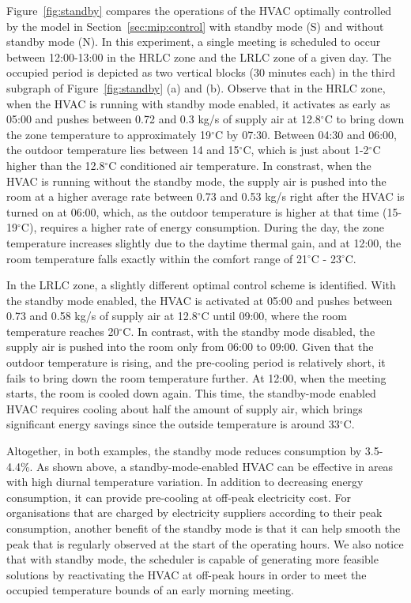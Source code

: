 Figure~\ref{fig:standby} compares the operations of the HVAC optimally controlled by the model in Section~\ref{sec:mip:control} with standby mode (S) and without standby mode (N). In this experiment, a single meeting is scheduled to occur between 12:00-13:00 in the HRLC zone and the LRLC zone of a given day. The occupied period is depicted as two vertical blocks (30 minutes each) in the third subgraph of Figure~\ref{fig:standby} (a) and (b). Observe that in the HRLC zone, when the HVAC is running with standby mode enabled, it activates as early as 05:00 and pushes between 0.72 and 0.3 kg/s of supply air at 12.8$^\circ$C to bring down the zone temperature to approximately 19$^\circ$C by 07:30. Between 04:30 and 06:00, the outdoor temperature lies between 14 and 15$^\circ$C, which is just about 1-2$^\circ$C higher than the 12.8$^\circ$C conditioned air temperature. In constrast, when the HVAC is running without the standby mode, the supply air is pushed into the room at a higher average rate between 0.73 and 0.53 kg/s right after the HVAC is turned on at 06:00, which, as the outdoor temperature is higher at that time (15-19$^\circ$C), requires a higher rate of energy consumption. During the day, the zone temperature increases slightly due to the daytime thermal gain, and at 12:00, the room temperature falls exactly within the comfort range of 21$^\circ$C - 23$^\circ$C. 

In the LRLC zone, a slightly different optimal control scheme is identified. With the standby mode enabled, the HVAC is activated at 05:00 and pushes between 0.73 and 0.58 kg/s of supply air at 12.8$^\circ$C until 09:00, where the room temperature reaches 20$^\circ$C. In contrast, with the standby mode disabled, the supply air is pushed into the room only from 06:00 to 09:00. Given that the outdoor temperature is rising, and the pre-cooling period is relatively short, it fails to bring down the room temperature further. At 12:00, when the meeting starts, the room is cooled down again. This time, the standby-mode enabled HVAC requires cooling about half the amount of supply air, which brings significant energy savings since the outside temperature is around 33$^\circ$C. 

Altogether, in both examples, the standby mode reduces consumption by 3.5-4.4\%. %
As shown above, a standby-mode-enabled HVAC can be effective in areas with high diurnal temperature variation.  In addition to decreasing energy consumption, it can provide pre-cooling at off-peak electricity cost. For organisations that are charged by electricity suppliers according to their peak consumption, another benefit of the standby mode is that it can help smooth the peak that is regularly observed at the start of the operating hours. We also notice that with standby mode, the scheduler is capable of generating more feasible solutions by reactivating the HVAC at off-peak hours in order to meet the occupied temperature bounds of an early morning meeting.


